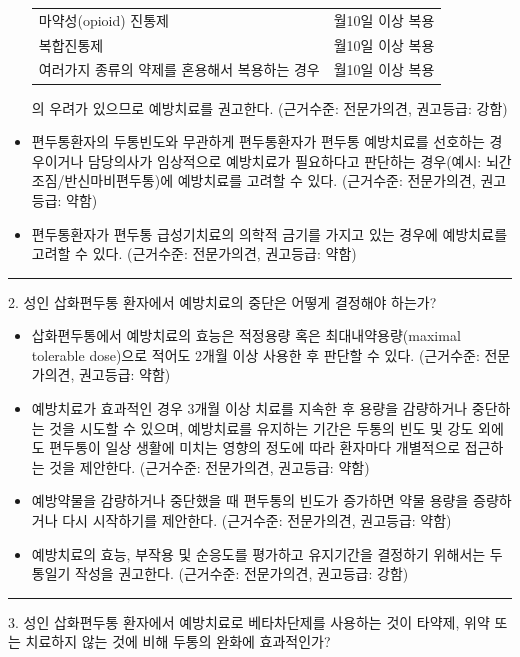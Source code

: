 \documentclass[]{book}
\begin{document}
\begin{itemize}
{\begin{longtable}[]{@{}lr@{}}
    마약성(opioid) 진통제 & 월10일 이상 복용\tabularnewline
    복합진통제 & 월10일 이상 복용\tabularnewline
    여러가지 종류의 약제를 혼용해서 복용하는 경우 & 월10일 이상 복용\tabularnewline
    \bottomrule
    \end{longtable}}의 우려가 있으므로 예방치료를 권고한다. (근거수준: 전문가의견, 권고등급: 강함)
\item
  편두통환자의 두통빈도와 무관하게 편두통환자가 편두통 예방치료를 선호하는 경우이거나 담당의사가 임상적으로 예방치료가 필요하다고 판단하는 경우(예시: 뇌간조짐/반신마비편두통)에 예방치료를 고려할 수 있다. (근거수준: 전문가의견, 권고등급: 약함)
\item
  편두통환자가 편두통 급성기치료의 의학적 금기를 가지고 있는 경우에 예방치료를 고려할 수 있다. (근거수준: 전문가의견, 권고등급: 약함)
\end{itemize}

\begin{center}\rule{0.5\linewidth}{\linethickness}\end{center}

2. 성인 삽화편두통 환자에서 예방치료의 중단은 어떻게 결정해야 하는가?

\begin{itemize}
\item
  삽화편두통에서 예방치료의 효능은 적정용량 혹은 최대내약용량(maximal tolerable dose)으로 적어도 2개월 이상 사용한 후 판단할 수 있다. (근거수준: 전문가의견, 권고등급: 약함)
\item
  예방치료가 효과적인 경우 3개월 이상 치료를 지속한 후 용량을 감량하거나 중단하는 것을 시도할 수 있으며, 예방치료를 유지하는 기간은 두통의 빈도 및 강도 외에도 편두통이 일상 생활에 미치는 영향의 정도에 따라 환자마다 개별적으로 접근하는 것을 제안한다. (근거수준: 전문가의견, 권고등급: 약함)
\item
  예방약물을 감량하거나 중단했을 때 편두통의 빈도가 증가하면 약물 용량을 증량하거나 다시 시작하기를 제안한다. (근거수준: 전문가의견, 권고등급: 약함)
\item
  예방치료의 효능, 부작용 및 순응도를 평가하고 유지기간을 결정하기 위해서는 두통일기 작성을 권고한다. (근거수준: 전문가의견, 권고등급: 강함)
\end{itemize}

\begin{center}\rule{0.5\linewidth}{\linethickness}\end{center}

3. 성인 삽화편두통 환자에서 예방치료로 베타차단제를 사용하는 것이 타약제, 위약 또는 치료하지 않는 것에 비해 두통의 완화에 효과적인가?
\end{document}
